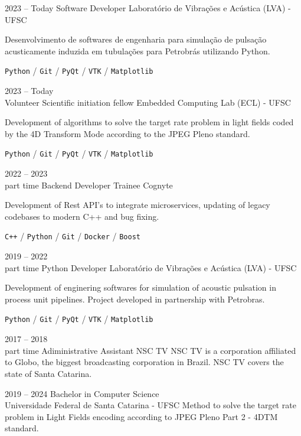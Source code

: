 \documentclass[11pt]{developercv} %
\begin{document}
\begin{entrylist}
	\entry
		{2023 -- Today}
		{Software Developer}
		{Laboratório de Vibrações e Acústica (LVA) - UFSC}
		{
			Desenvolvimento de softwares de engenharia para simulação de pulsação acusticamente induzida em tubulações para Petrobrás utilizando Python. 
			
			\texttt{Python} / \texttt{Git} / \texttt{PyQt} / \texttt{VTK} / \texttt{Matplotlib}
		}

	\entry
		{2023 -- Today \\ \footnotesize{Volunteer}}
		{Scientific initiation fellow}
		{Embedded Computing Lab (ECL) - UFSC}
		{
			Development of algorithms to solve the target rate problem in light fields coded by the 4D Transform Mode according to the JPEG Pleno standard.

			\texttt{Python} / \texttt{Git} / \texttt{PyQt} / \texttt{VTK} / \texttt{Matplotlib}
		}

	\entry
		{2022 -- 2023 \\ \footnotesize{part time}}
		{Backend Developer Trainee}
		{Cognyte}
		{
			Development of Rest API's to integrate microservices, updating of legacy codebases to modern C++ and bug fixing.
            
            \texttt{C++} / \texttt{Python} / \texttt{Git} / \texttt{Docker} / \texttt{Boost}
        }
	\entry
		{2019 -- 2022\\\footnotesize{part time}}
		{Python Developer}
		{Laboratório de Vibrações e Acústica (LVA) - UFSC}
		{
			Development of enginering softwares for simulation of acoustic pulsation in process unit pipelines. Project developed in partnership with Petrobras.
            
            \texttt{Python} / \texttt{Git} / \texttt{PyQt} / \texttt{VTK} / \texttt{Matplotlib}
        }
	\entry
		{2017 -- 2018 \\ \footnotesize{part time}}
		{Adiministrative Assistant}
		{NSC TV}
		{
            NSC TV is a corporation affiliated to Globo, the biggest broadcasting corporation in Brazil. NSC TV covers the state of Santa Catarina. 
        }
\end{entrylist}



\begin{entrylist}
	\entry
		{2019 -- 2024}
		{Bachelor in Computer Science}
		{\\Universidade Federal de Santa Catarina - UFSC}
		{
			Method to solve the target rate problem in Light Fields encoding according to JPEG Pleno Part 2 - 4DTM standard.
		}
\end{entrylist}
\end{document}
